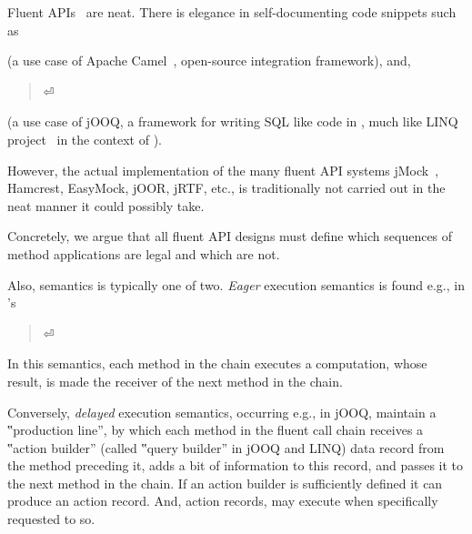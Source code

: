 Fluent APIs~\cite{VanDeursen:Klint:2000,Hudak:1997,Fowler:2010} are
neat. There is elegance in self-documenting code snippets such as
\begin{quote}
  \label{figure:DSL}
  \parbox[c]{44ex}{}
\end{quote}
(a use case of Apache Camel~\cite{Ibsen:Anstey:10}, open-source integration
framework), and,
\begin{quote}
  \parbox[c]{53ex}{}⏎
\end{quote}
(a use case of jOOQ, a framework for writing
SQL like code in \Java, much like LINQ project~\cite{Meijer:Beckman:Bierman:06}
in the context of \CSharp).

However, the actual implementation of the many fluent API systems
jMock~\cite{Freeman:Pryce:06},
Hamcrest,
EasyMock,
jOOR,
jRTF,
etc., is traditionally not carried out
in the neat manner it could possibly take.

Concretely, we argue that all fluent API designs
must define which sequences of method applications are legal
and which are not.

Also, semantics is typically one of two.
\emph{Eager} execution semantics is
found e.g., in \Java's 

\begin{quote}
  \parbox[c]{53ex}{}⏎
\end{quote}

In this semantics, each method in the chain executes a computation,
  whose result, is made the receiver of the next method
  in the chain.

Conversely, \emph{delayed} execution semantics, occurring e.g., in jOOQ,
  maintain a ‟production line”,
  by which each method in the fluent call chain receives a
  ‟action builder” (called ‟query builder” in jOOQ and LINQ)
  data record from the method preceding it, adds a bit of
  information to this record, and passes it to the next method
  in the chain.
If an action builder is sufficiently defined it can
  produce an action record.
And, action records, may execute
  when specifically requested to so.

